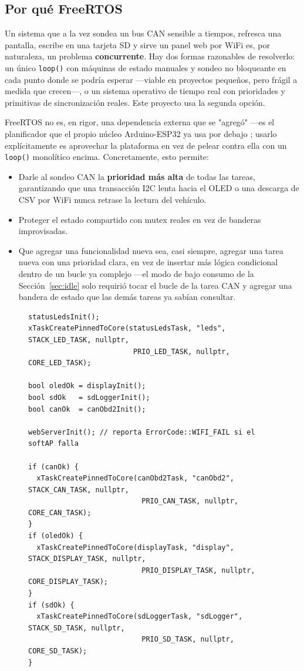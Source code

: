 \subsection{Por qué FreeRTOS}
Un sistema que a la vez sondea un bus CAN sensible a tiempos, refresca una
pantalla, escribe en una tarjeta SD y sirve un panel web por WiFi es, por
naturaleza, un problema \textbf{concurrente}. Hay dos formas razonables de
resolverlo: un único \texttt{loop()} con máquinas de estado manuales y
sondeo no bloqueante en cada punto donde se podría esperar —viable en
proyectos pequeños, pero frágil a medida que crecen—, o un sistema operativo
de tiempo real con prioridades y primitivas de sincronización reales. Este
proyecto usa la segunda opción.

FreeRTOS no es, en rigor, una dependencia externa que se "agregó" —es el
planificador que el propio núcleo Arduino-ESP32 ya usa por debajo
\cite{freertos2024}; usarlo explícitamente es aprovechar la plataforma en
vez de pelear contra ella con un \texttt{loop()} monolítico encima.
Concretamente, esto permite:

\begin{itemize}
  \item Darle al sondeo CAN la \textbf{prioridad más alta} de todas las
        tareas, garantizando que una transacción I2C lenta hacia el OLED o
        una descarga de CSV por WiFi nunca retrase la lectura del vehículo.
  \item Proteger el estado compartido con mutex reales en vez de banderas
        improvisadas.
  \item Que agregar una funcionalidad nueva sea, casi siempre, agregar una
        tarea nueva con una prioridad clara, en vez de insertar más lógica
        condicional dentro de un bucle ya complejo —el modo de bajo consumo
        de la Sección~\ref{sec:idle} solo requirió tocar el bucle de la
        tarea CAN y agregar una bandera de estado que las demás tareas ya
        sabían consultar.
\end{itemize}

\begin{figure}[H]
\begin{lstlisting}[caption={Creación de tareas FreeRTOS en \texttt{src/main.cpp}.}, label={fig:tasks}]
statusLedsInit();
xTaskCreatePinnedToCore(statusLedsTask, "leds", STACK_LED_TASK, nullptr,
                         PRIO_LED_TASK, nullptr, CORE_LED_TASK);

bool oledOk = displayInit();
bool sdOk   = sdLoggerInit();
bool canOk  = canObd2Init();

webServerInit(); // reporta ErrorCode::WIFI_FAIL si el softAP falla

if (canOk) {
  xTaskCreatePinnedToCore(canObd2Task, "canObd2", STACK_CAN_TASK, nullptr,
                           PRIO_CAN_TASK, nullptr, CORE_CAN_TASK);
}
if (oledOk) {
  xTaskCreatePinnedToCore(displayTask, "display", STACK_DISPLAY_TASK, nullptr,
                           PRIO_DISPLAY_TASK, nullptr, CORE_DISPLAY_TASK);
}
if (sdOk) {
  xTaskCreatePinnedToCore(sdLoggerTask, "sdLogger", STACK_SD_TASK, nullptr,
                           PRIO_SD_TASK, nullptr, CORE_SD_TASK);
}
\end{lstlisting}
\end{figure}

